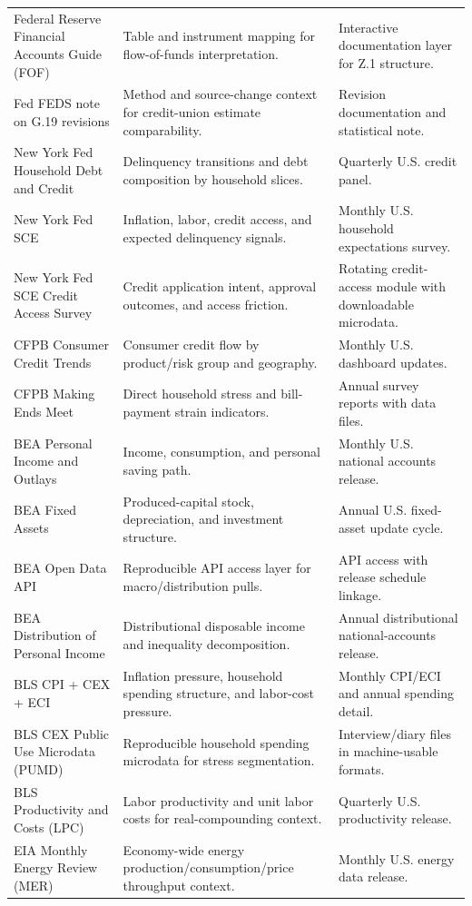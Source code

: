 \documentclass[11pt,openany]{book}
\begin{document}
\begin{longtable}{>{\raggedright\arraybackslash}p{}p{}p{}}
Federal Reserve Financial Accounts Guide (FOF) & Table and instrument mapping for flow-of-funds interpretation. & Interactive documentation layer for Z.1 structure. \\
Fed FEDS note on G.19 revisions & Method and source-change context for credit-union estimate comparability. & Revision documentation and statistical note. \\
New York Fed Household Debt and Credit & Delinquency transitions and debt composition by household slices. & Quarterly U.S. credit panel. \\
New York Fed SCE & Inflation, labor, credit access, and expected delinquency signals. & Monthly U.S. household expectations survey. \\
New York Fed SCE Credit Access Survey & Credit application intent, approval outcomes, and access friction. & Rotating credit-access module with downloadable microdata. \\
CFPB Consumer Credit Trends & Consumer credit flow by product/risk group and geography. & Monthly U.S. dashboard updates. \\
CFPB Making Ends Meet & Direct household stress and bill-payment strain indicators. & Annual survey reports with data files. \\
BEA Personal Income and Outlays & Income, consumption, and personal saving path. & Monthly U.S. national accounts release. \\
BEA Fixed Assets & Produced-capital stock, depreciation, and investment structure. & Annual U.S. fixed-asset update cycle. \\
BEA Open Data API & Reproducible API access layer for macro/distribution pulls. & API access with release schedule linkage. \\
BEA Distribution of Personal Income & Distributional disposable income and inequality decomposition. & Annual distributional national-accounts release. \\
BLS CPI + CEX + ECI & Inflation pressure, household spending structure, and labor-cost pressure. & Monthly CPI/ECI and annual spending detail. \\
BLS CEX Public Use Microdata (PUMD) & Reproducible household spending microdata for stress segmentation. & Interview/diary files in machine-usable formats. \\
BLS Productivity and Costs (LPC) & Labor productivity and unit labor costs for real-compounding context. & Quarterly U.S. productivity release. \\
EIA Monthly Energy Review (MER) & Economy-wide energy production/consumption/price throughput context. & Monthly U.S. energy data release. \\

\end{longtable}
\end{document}
